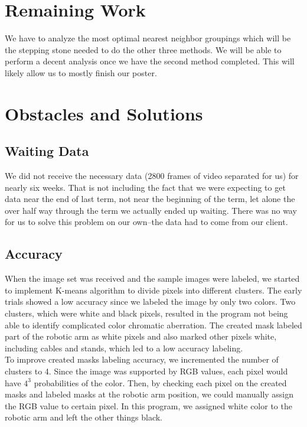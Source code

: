\documentclass[10pt,journal,compsoc, draftclsnofoot,onecolumn]{IEEEtran}
\begin{document}
\section{Remaining Work}
We have to analyze the most optimal nearest neighbor groupings which will be the stepping stone needed to do the other three methods.
We will be able to perform a decent analysis once we have the second method completed.
This will likely allow us to mostly finish our poster.

\section{Obstacles and Solutions}
\subsection{Waiting Data}
We did not receive the necessary data (2800 frames of video separated for us) for nearly six weeks. That is not including the fact that we were expecting to get data near the end of last term, not near the beginning of the term, let alone the over half way through the term we actually ended up waiting. There was no way for us to solve this problem on our own--the data had to come from our client.

\subsection{Accuracy}
When the image set was received and the sample images were labeled, we started to implement K-means algorithm to divide pixels into different clusters. The early trials showed a low accuracy since we labeled the image by only two colors. Two clusters, which were white and black pixels, resulted in the program not being able to identify complicated color chromatic aberration. The created mask labeled part of the robotic arm as white pixels and also marked other pixels white, including cables and stands, which led to a low accuracy labeling. \\

\noindent To improve created masks labeling accuracy, we incremented the number of clusters to 4. Since the image was supported by RGB values, each pixel would have $4^3$ probabilities of the color. Then, by checking each pixel on the created masks and labeled masks at the robotic arm position, we could manually assign the RGB value to certain pixel. In this program, we assigned white color to the robotic arm and left the other things black.
\\
\end{document}
